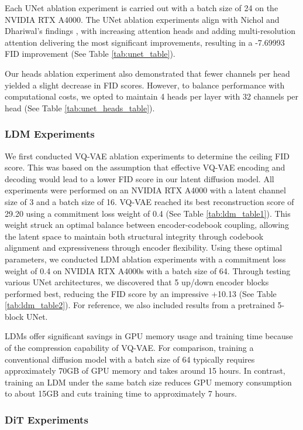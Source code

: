 \documentclass[conference]{IEEEtran}
\begin{document}
Each UNet ablation experiment is carried out with a batch size of 24 on the NVIDIA RTX A4000. The UNet ablation experiments align with Nichol and Dhariwal's findings \cite{dhariwalDiffusionModelsBeat2021}, with increasing attention heads and adding multi-resolution attention delivering the most significant improvements, resulting in a -7.69993 FID improvement (See Table \ref{tab:unet_table}).

Our heads ablation experiment also demonstrated that fewer channels per head yielded a slight decrease in FID scores. However, to balance performance with computational costs, we opted to maintain 4 heads per layer with 32 channels per head (See Table \ref{tab:unet_heads_table}).

\subsubsection{LDM Experiments}\label{e_ldm}

We first conducted VQ-VAE ablation experiments to determine the ceiling FID score. This was based on the assumption that effective VQ-VAE encoding and decoding would lead to a lower FID score in our latent diffusion model. All experiments were performed on an NVIDIA RTX A4000 with a latent channel size of 3 and a batch size of 16. VQ-VAE reached its best reconstruction score of 29.20 using a commitment loss weight of 0.4 (See Table \ref{tab:ldm_table1}). This weight struck an optimal balance between encoder-codebook coupling, allowing the latent space to maintain both structural integrity through codebook alignment and expressiveness through encoder flexibility. Using these optimal parameters, we conducted LDM ablation experiments with a commitment loss weight of 0.4 on NVIDIA RTX A4000s with a batch size of 64. Through testing various UNet architectures, we discovered that 5 up/down encoder blocks performed best, reducing the FID score by an impressive +10.13 (See Table \ref{tab:ldm_table2}). For reference, we also included results from a pretrained 5-block UNet. 

LDMs offer significant savings in GPU memory usage and training time because of the compression capability of VQ-VAE. For comparison, training a conventional diffusion model with a batch size of 64 typically requires approximately 70GB of GPU memory and takes around 15 hours. In contrast, training an LDM under the same batch size reduces GPU memory consumption to about 15GB and cuts training time to approximately 7 hours.

\subsubsection{DiT Experiments}\label{e_dit}
\end{document}
